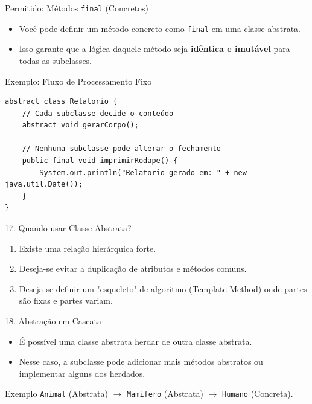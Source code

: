 \documentclass[9pt]{beamer}
\begin{document}
\begin{frame}[fragile]{Permitido: Métodos \texttt{final} (Concretos)}
\begin{itemize}
    \item Você pode definir um método concreto como \texttt{final} em uma classe abstrata.
    \item Isso garante que a lógica daquele método seja \textbf{idêntica e imutável} para todas as subclasses.
\end{itemize}

\begin{block}{Exemplo: Fluxo de Processamento Fixo}
\begin{verbatim}
abstract class Relatorio {
    // Cada subclasse decide o conteúdo
    abstract void gerarCorpo();

    // Nenhuma subclasse pode alterar o fechamento
    public final void imprimirRodape() {
        System.out.println("Relatorio gerado em: " + new java.util.Date());
    }
}
\end{verbatim}
\end{block}
\end{frame}

\begin{frame}{17. Quando usar Classe Abstrata?}
    \begin{enumerate}
        \item Existe uma relação hierárquica forte.
        \item Deseja-se evitar a duplicação de atributos e métodos comuns.
        \item Deseja-se definir um "esqueleto" de algoritmo (Template Method) onde partes são fixas e partes variam.
    \end{enumerate}
\end{frame}

\begin{frame}{18. Abstração em Cascata}
    \begin{itemize}
        \item É possível uma classe abstrata herdar de outra classe abstrata.
        \item Nesse caso, a subclasse pode adicionar mais métodos abstratos ou implementar alguns dos herdados.
    \end{itemize}
    \begin{exampleblock}{Exemplo}
        \texttt{Animal} (Abstrata) $\rightarrow$ \texttt{Mamifero} (Abstrata) $\rightarrow$ \texttt{Humano} (Concreta).
    \end{exampleblock}
\end{frame}
\end{document}

